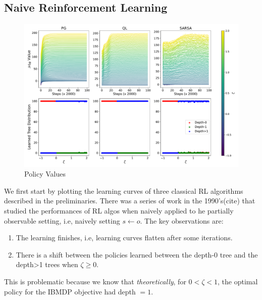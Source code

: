 \subsection{Naive Reinforcement Learning}
\begin{figure}[htbp]
    \centering
    \includegraphics[width=1\textwidth]{images/images_part1/quick_plot_combined}
    \caption{Policy Values}\label{fig:naive-rl}
\end{figure}
We first start by plotting the learning curves of three classical RL algorithms described in the preliminaries. There was a series of work in the 1990's(cite) that studied the performances of RL algos when naively applied to he partially observable setting, i.e, naively setting $s\leftarrow o$.
The key observations are:
\begin{enumerate}
    \item The learning finishes, i.e, learning curves flatten after some iterations.
    \item There is a shift between the policies learned between the depth-0 tree and the depth>1 trees when $\zeta\geq0$.
\end{enumerate}
This is problematic because we know that \textit{theoretically}, for $0<\zeta<1$, the optimal policy for the IBMDP objective had depth $= 1$.
